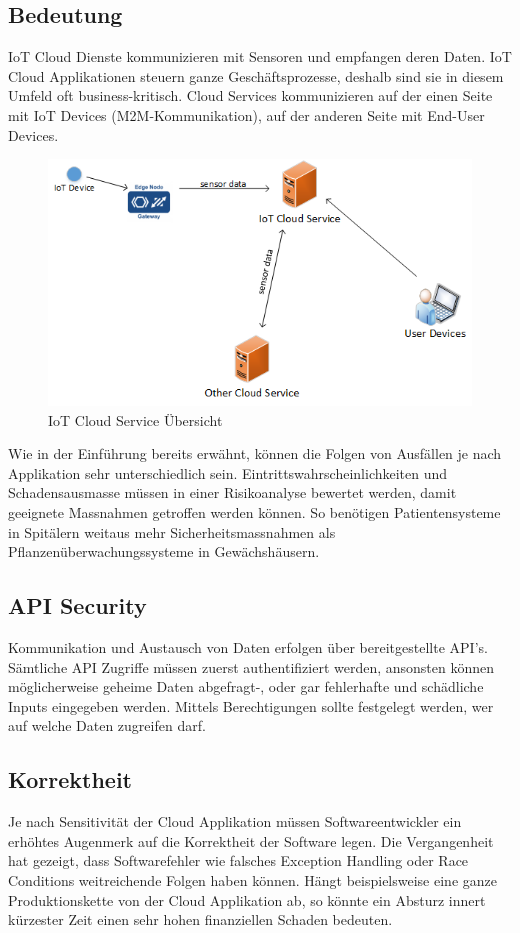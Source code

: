 \subsection{Bedeutung}
IoT Cloud Dienste kommunizieren mit Sensoren und empfangen deren Daten. IoT Cloud Applikationen steuern ganze Geschäftsprozesse, deshalb sind sie in diesem Umfeld oft business-kritisch. Cloud Services kommunizieren auf der einen Seite mit IoT Devices (M2M-Kommunikation), auf der anderen Seite mit End-User Devices.  
\begin{figure}[H]
\centering
\includegraphics[scale=0.8]{../02_Analyse/images/cloudservices.png}
\caption{IoT Cloud Service Übersicht}
\end{figure}

Wie in der Einführung bereits erwähnt, können die Folgen von Ausfällen je nach Applikation sehr unterschiedlich sein. Eintrittswahrscheinlichkeiten und Schadensausmasse müssen in einer Risikoanalyse bewertet werden, damit geeignete Massnahmen getroffen werden können. So benötigen Patientensysteme in Spitälern weitaus mehr Sicherheitsmassnahmen als Pflanzenüberwachungssysteme in Gewächshäusern.

\subsection{API Security}
Kommunikation und Austausch von Daten erfolgen über bereitgestellte API's. Sämtliche API Zugriffe müssen zuerst authentifiziert werden, ansonsten können möglicherweise geheime Daten abgefragt-, oder gar fehlerhafte und schädliche Inputs eingegeben werden. Mittels Berechtigungen sollte festgelegt werden, wer auf welche Daten zugreifen darf. 

\subsection{Korrektheit}
Je nach Sensitivität der Cloud Applikation müssen Softwareentwickler ein erhöhtes Augenmerk auf die Korrektheit der Software legen. Die Vergangenheit hat gezeigt, dass Softwarefehler wie falsches Exception Handling oder Race Conditions weitreichende Folgen haben können. Hängt beispielsweise eine ganze Produktionskette von der Cloud Applikation ab, so könnte ein Absturz innert kürzester Zeit einen sehr hohen finanziellen Schaden bedeuten. 

